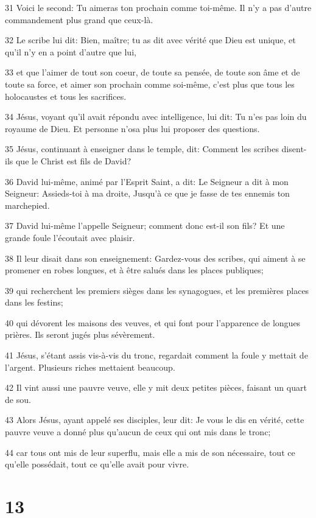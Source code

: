 \par 31 Voici le second: Tu aimeras ton prochain comme toi-même. Il n'y a pas d'autre commandement plus grand que ceux-là.
\par 32 Le scribe lui dit: Bien, maître; tu as dit avec vérité que Dieu est unique, et qu'il n'y en a point d'autre que lui,
\par 33 et que l'aimer de tout son coeur, de toute sa pensée, de toute son âme et de toute sa force, et aimer son prochain comme soi-même, c'est plus que tous les holocaustes et tous les sacrifices.
\par 34 Jésus, voyant qu'il avait répondu avec intelligence, lui dit: Tu n'es pas loin du royaume de Dieu. Et personne n'osa plus lui proposer des questions.
\par 35 Jésus, continuant à enseigner dans le temple, dit: Comment les scribes disent-ils que le Christ est fils de David?
\par 36 David lui-même, animé par l'Esprit Saint, a dit: Le Seigneur a dit à mon Seigneur: Assieds-toi à ma droite, Jusqu'à ce que je fasse de tes ennemis ton marchepied.
\par 37 David lui-même l'appelle Seigneur; comment donc est-il son fils? Et une grande foule l'écoutait avec plaisir.
\par 38 Il leur disait dans son enseignement: Gardez-vous des scribes, qui aiment à se promener en robes longues, et à être salués dans les places publiques;
\par 39 qui recherchent les premiers sièges dans les synagogues, et les premières places dans les festins;
\par 40 qui dévorent les maisons des veuves, et qui font pour l'apparence de longues prières. Ils seront jugés plus sévèrement.
\par 41 Jésus, s'étant assis vis-à-vis du tronc, regardait comment la foule y mettait de l'argent. Plusieurs riches mettaient beaucoup.
\par 42 Il vint aussi une pauvre veuve, elle y mit deux petites pièces, faisant un quart de sou.
\par 43 Alors Jésus, ayant appelé ses disciples, leur dit: Je vous le dis en vérité, cette pauvre veuve a donné plus qu'aucun de ceux qui ont mis dans le tronc;
\par 44 car tous ont mis de leur superflu, mais elle a mis de son nécessaire, tout ce qu'elle possédait, tout ce qu'elle avait pour vivre.

\chapter{13}

